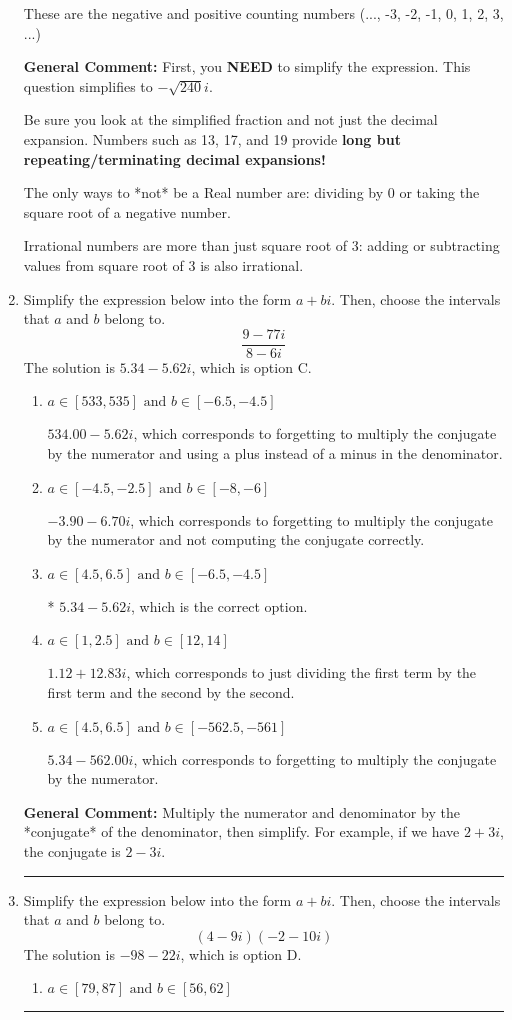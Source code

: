 \documentclass{extbook}[14pt]
\newcommand{\litem}[1]{\item #1

\rule{\textwidth}{0.4pt}}
\begin{document}
\begin{enumerate}
{\begin{enumerate}[label=\Alph*.]
These are the negative and positive counting numbers (..., -3, -2, -1, 0, 1, 2, 3, ...)
\end{enumerate}

\textbf{General Comment:} First, you \textbf{NEED} to simplify the expression. This question simplifies to $-\sqrt{240} i$. 
 
 Be sure you look at the simplified fraction and not just the decimal expansion. Numbers such as 13, 17, and 19 provide \textbf{long but repeating/terminating decimal expansions!} 
 
 The only ways to *not* be a Real number are: dividing by 0 or taking the square root of a negative number. 
 
 Irrational numbers are more than just square root of 3: adding or subtracting values from square root of 3 is also irrational.
}
\litem{
Simplify the expression below into the form $a+bi$. Then, choose the intervals that $a$ and $b$ belong to.
\[ \frac{9 - 77 i}{8 - 6 i} \]The solution is \( 5.34  - 5.62 i \), which is option C.\begin{enumerate}[label=\Alph*.]
\item \( a \in [533, 535] \text{ and } b \in [-6.5, -4.5] \)

 $534.00  - 5.62 i$, which corresponds to forgetting to multiply the conjugate by the numerator and using a plus instead of a minus in the denominator.
\item \( a \in [-4.5, -2.5] \text{ and } b \in [-8, -6] \)

 $-3.90  - 6.70 i$, which corresponds to forgetting to multiply the conjugate by the numerator and not computing the conjugate correctly.
\item \( a \in [4.5, 6.5] \text{ and } b \in [-6.5, -4.5] \)

* $5.34  - 5.62 i$, which is the correct option.
\item \( a \in [1, 2.5] \text{ and } b \in [12, 14] \)

 $1.12  + 12.83 i$, which corresponds to just dividing the first term by the first term and the second by the second.
\item \( a \in [4.5, 6.5] \text{ and } b \in [-562.5, -561] \)

 $5.34  - 562.00 i$, which corresponds to forgetting to multiply the conjugate by the numerator.
\end{enumerate}

\textbf{General Comment:} Multiply the numerator and denominator by the *conjugate* of the denominator, then simplify. For example, if we have $2+3i$, the conjugate is $2-3i$.
}
\litem{
Simplify the expression below into the form $a+bi$. Then, choose the intervals that $a$ and $b$ belong to.
\[ (4 - 9 i)(-2 - 10 i) \]The solution is \( -98 - 22 i \), which is option D.\begin{enumerate}[label=\Alph*.]
\item \( a \in [79, 87] \text{ and } b \in [56, 62] \)


\end{enumerate}}
\end{enumerate}
\end{document}
